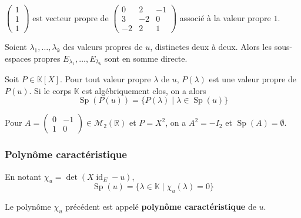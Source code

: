   \begin{example}
    $\begin{pmatrix} 1 \\ 1 \\ 1 \end{pmatrix}$ est vecteur propre de $\begin{pmatrix} 0 & 2 & -1 \\ 3 & -2 & 0 \\ -2 & 2 & 1 \end{pmatrix}$ associé à la valeur propre $1$.
  \end{example}

  \begin{theorem}
    Soient $\lambda_1, \dots, \lambda_k$ des valeurs propres de $u$, distinctes deux à deux. Alors les sous-espaces propres $E_{\lambda_1}, \dots, E_{\lambda_k}$ sont en somme directe.
  \end{theorem}


  \begin{theorem}
    Soit $P \in \mathbb{K}[X]$. Pour tout valeur propre $\lambda$ de $u$, $P(\lambda)$ est une valeur propre de $P(u)$. Si le corps $\mathbb{K}$ est algébriquement clos, on a alors
    \[ \operatorname{Sp}(P(u)) = \{ P(\lambda) \mid \lambda \in \operatorname{Sp}(u) \} \]
  \end{theorem}

  \begin{cexample}
    Pour $A = \begin{pmatrix} 0 & -1 \\ 1 & 0 \end{pmatrix} \in \mathcal{M}_2(\mathbb{R})$ et $P = X^2$, on a $A^2 = -I_2$ et $\operatorname{Sp}(A) = \emptyset$.
  \end{cexample}

  \subsubsection{Polynôme caractéristique}


  \begin{proposition}
    En notant $\chi_u = \det(X \operatorname{id}_E - u)$,
    \[ \operatorname{Sp}(u) = \{ \lambda \in \mathbb{K} \mid \chi_u(\lambda) = 0 \} \]
  \end{proposition}

  \begin{definition}
    Le polynôme $\chi_u$ précédent est appelé \textbf{polynôme caractéristique} de $u$.
  \end{definition}

